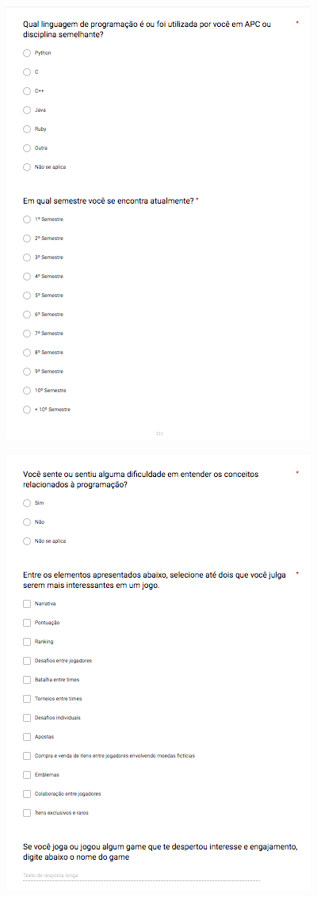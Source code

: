 \begin{apendicesenv}
\begin{figure}[h]
	\centering
	\includegraphics[keepaspectratio=true,scale=0.9]{figuras/q2.png}
\end{figure}

\begin{figure}[h]
	\centering
	\includegraphics[keepaspectratio=true,scale=0.9]{figuras/q3.png}
\end{figure}


\end{apendicesenv}
